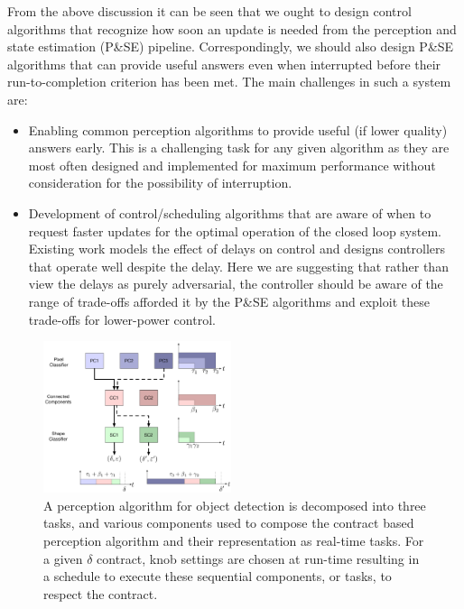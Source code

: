 From the above discussion it can be seen that we ought to design control algorithms that recognize how soon an update is needed from the perception and state estimation (P\&SE) pipeline. 
Correspondingly, we should also design P\&SE  algorithms that can provide useful answers even when interrupted before their run-to-completion criterion has been met. 
The main challenges in such a system are:
\begin{itemize}
\item Enabling common perception algorithms to provide useful (if lower quality) answers early.
This is a challenging task for any given algorithm as they are most often designed and implemented for maximum performance without consideration for the possibility of interruption.
\item Development of control/scheduling algorithms that are aware of when to request faster updates for the optimal operation of the closed loop system.
Existing work models the effect of delays on control and designs controllers that operate well despite the delay.
Here we are suggesting that rather than view the delays as purely adversarial, the controller should be aware of the range of trade-offs afforded it by the P\&SE algorithms and exploit these trade-offs for lower-power control. 
\end{itemize}
\begin{figure}[!b]
	\centering
	\vspace{-20pt}
	\includegraphics[width=0.49\textwidth]{Figures/real_time_figure.pdf}
	\caption{A perception algorithm for object detection is decomposed into three tasks, and various components used to compose the contract based perception algorithm and their representation as real-time tasks. For a given $\delta$ contract, knob settings are chosen at run-time resulting in a schedule to execute these sequential components, or tasks, to respect the contract. }
	\label{fig:offline}
\end{figure}

